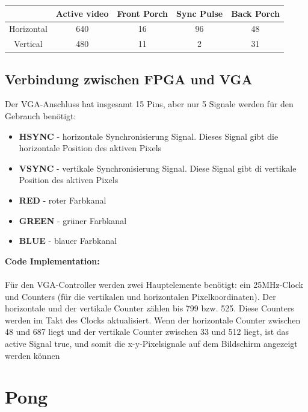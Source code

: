 \documentclass[a4paper, 11pt]{article}
\begin{document}
\begin{center}
\begin{tabular}{|c|c|c|c|c|}
    \hline
     & Active video & Front Porch & Sync Pulse & Back Porch \\ 
    \hline
    Horizontal & 640 & 16 & 96 & 48 \\ 
    \hline
    Vertical & 480 & 11 & 2 & 31 \\ 
    \hline
\end{tabular}
\end{center}

\subsection{Verbindung zwischen FPGA und VGA}                          

    Der VGA-Anschluss hat insgesamt 15 Pins, aber nur 5 Signale werden für den Gebrauch benötigt:
    \begin{itemize}
        \item \textbf{HSYNC} - horizontale Synchronisierung Signal. Dieses Signal gibt die horizontale Position des aktiven Pixels
        \item \textbf{VSYNC} - vertikale Synchronisierung Signal. Diese Signal gibt di vertikale Position des aktiven Pixels
        \item \textbf{RED} - roter Farbkanal
        \item \textbf{GREEN} - grüner Farbkanal
        \item \textbf{BLUE} - blauer Farbkanal
    \end{itemize}
    

    \textbf{Code Implementation:}
    \\
    \\Für den VGA-Controller werden zwei Hauptelemente benötigt: ein 25MHz-Clock und Counters (für die vertikalen und horizontalen Pixelkoordinaten). Der horizontale und der vertikale Counter zählen bis 799 bzw. 525. Diese Counters werden im Takt des Clocks aktualisiert. Wenn der horizontale Counter zwischen 48 und 687 liegt und der vertikale Counter zwischen 33 und 512 liegt, ist das active Signal true, und somit die x-y-Pixelsignale auf dem Bildschirm angezeigt werden können

\section{Pong }  
    
\end{document}
